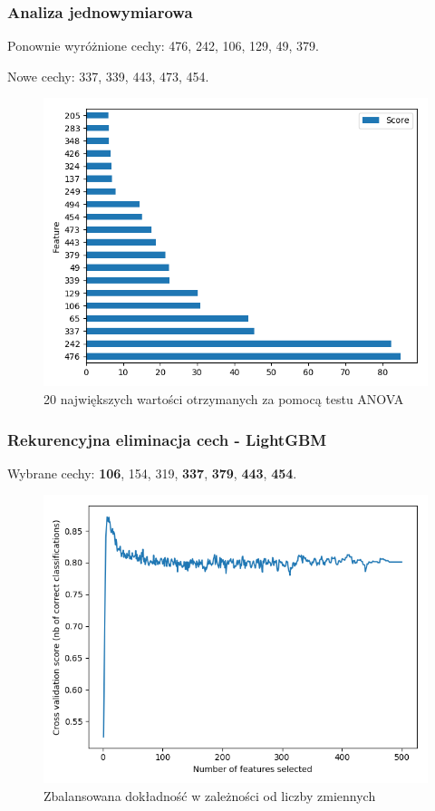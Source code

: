 \documentclass{beamer}
\begin{document}
    \begin{frame}
        \frametitle{Analiza jednowymiarowa}
        Ponownie wyróżnione cechy: 476, 242, 106, 129, 49, 379.

        Nowe cechy: 337, 339, 443, 473, 454.
        \begin{figure}
            \centering
            \includegraphics[width=0.65\linewidth]{../images/univariate-selection.png}
            \caption{20 największych wartości otrzymanych za pomocą testu ANOVA}
            \label{fig:univariate-selection}
        \end{figure}
    \end{frame}

    \begin{frame}
        \frametitle{Rekurencyjna eliminacja cech - LightGBM}
        Wybrane cechy: \textbf{106}, 154, 319, \textbf{337}, \textbf{379}, \textbf{443}, \textbf{454}.
        \begin{figure}[h!]
            \centering
            \includegraphics[width=0.75\linewidth]{../images/lightgbm-rfe-cv.png}
            \caption{Zbalansowana dokładność w zależności od liczby zmiennych}
            \label{fig:rfe-cv-lightgbm}
        \end{figure}
    \end{frame}
\end{document}
